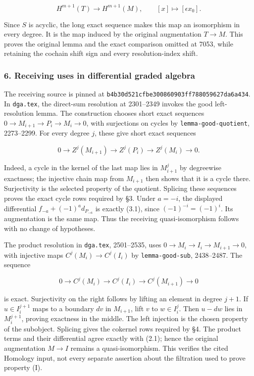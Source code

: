 \documentclass[11pt]{article}
\begin{document}
\[
H^{m+1}(T)\longrightarrow H^{m+1}(M),\qquad
[x]\longmapsto[\epsilon x_0].
\]

Since \(S\) is acyclic, the long exact sequence makes this map an isomorphism in every degree. It is the map induced by the original augmentation \(T\to M\). This proves the original lemma and the exact comparison omitted at 7053, while retaining the cochain shift sign and every resolution-index shift.

\subsubsection{6. Receiving uses in differential graded algebra}\label{receiving-uses-in-differential-graded-algebra}

The receiving source is pinned at \texttt{b4b30d521cfbe300860903ff788059627da6a434}. In \texttt{dga.tex}, the direct-sum resolution at 2301--2349 invokes the good left-resolution lemma. The construction chooses short exact sequences \(0\to M_{i+1}\to P_i\to M_i\to0\), with surjections on cycles by \texttt{lemma-good-quotient}, 2273--2299. For every degree \(j\), these give short exact sequences

\[
0\to Z^j(M_{i+1})\to Z^j(P_i)\to Z^j(M_i)\to0.
\]

Indeed, a cycle in the kernel of the last map lies in \(M_{i+1}^j\) by degreewise exactness; the injective chain map from \(M_{i+1}\) then shows that it is a cycle there. Surjectivity is the selected property of the quotient. Splicing these sequences proves the exact cycle rows required by §3. Under \(a=-i\), the displayed differential \(f_{-a}+(-1)^a d_{P_{-a}}\) is exactly (3.1), since \((-1)^{-i}=(-1)^i\). Its augmentation is the same map. Thus the receiving quasi-isomorphism follows with no change of hypotheses.

The product resolution in \texttt{dga.tex}, 2501--2535, uses \(0\to M_i\to I_i\to M_{i+1}\to0\), with injective maps \(C^j(M_i)\to C^j(I_i)\) by \texttt{lemma-good-sub}, 2438--2487. The sequence

\[
0\to C^j(M_i)\to C^j(I_i)\to C^j(M_{i+1})\to0
\]

is exact. Surjectivity on the right follows by lifting an element in degree \(j+1\). If \(u\in I_i^{j+1}\) maps to a boundary \(dv\) in \(M_{i+1}\), lift \(v\) to \(w\in I_i^j\). Then \(u-dw\) lies in \(M_i^{j+1}\), proving exactness in the middle. The left injection is the chosen property of the subobject. Splicing gives the cokernel rows required by §4. The product terms and their differential agree exactly with (2.1); hence the original augmentation \(M\to I\) remains a quasi-isomorphism. This verifies the cited Homology input, not every separate assertion about the filtration used to prove property (I).
\end{document}
